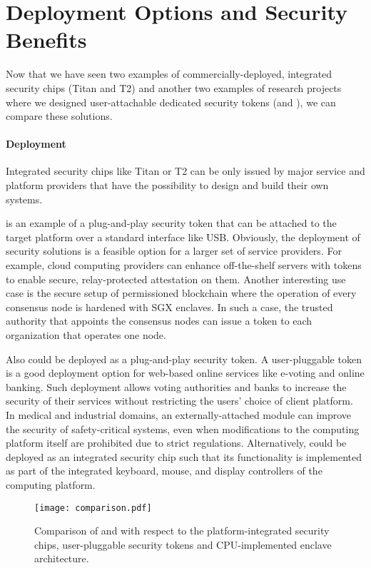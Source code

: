 
\section*{Deployment Options and Security Benefits}

Now that we have seen two examples of commercially-deployed, integrated security chips (Titan and T2) and another two examples of research projects where we designed user-attachable dedicated security tokens (\protection and \proximitee), we can compare these solutions. 

\paragraph{Deployment}
Integrated security chips like Titan or T2 can be only issued by major service and platform providers that have the possibility to design and build their own systems. 

\proximitee is an example of a plug-and-play security token that can be attached to the target platform over a standard interface like USB. Obviously, the deployment of security solutions is a feasible option for a larger set of service providers. For example, cloud computing providers can enhance off-the-shelf servers with \proximitee tokens to enable secure, relay-protected attestation on them. Another interesting use case is the secure setup of permissioned blockchain where the operation of every consensus node is hardened with SGX enclaves. In such a case, the trusted authority that appoints the consensus nodes can issue a \key token to each organization that operates one node.

Also \protection could be deployed as a plug-and-play security token. A user-pluggable token is a good deployment option for web-based online services like e-voting and online banking. Such deployment allows voting authorities and banks to increase the security of their services without restricting the users’ choice of client platform. In medical and industrial domains, an externally-attached \protection module can improve the security of safety-critical systems, even when modifications to the computing platform itself are prohibited due to strict regulations. Alternatively, \protection could be deployed as an integrated security chip such that its functionality is implemented as part of the integrated keyboard, mouse, and display controllers of the computing platform. 

\begin{figure}[t]
    \centering
    \texttt{[image: comparison.pdf]}
    \caption{Comparison of \protection and \proximitee with respect to the platform-integrated security chips, user-pluggable security tokens and CPU-implemented enclave architecture.}
\label{fig:prototype}   
\end{figure}


